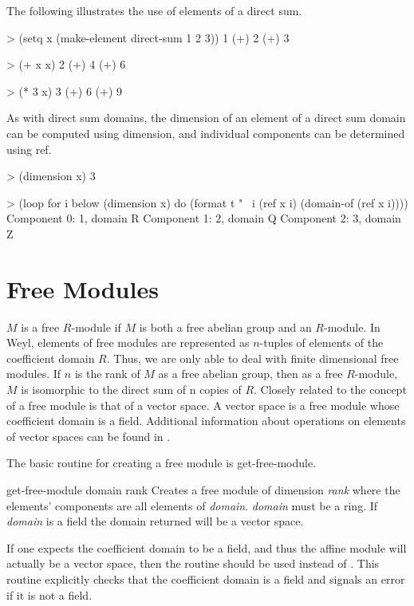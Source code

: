 The following illustrates the use of elements of a direct sum.
\begin{code}  
> (setq x (make-element direct-sum 1 2 3))
1 (+) 2 (+) 3 
  
> (+ x x) 
2 (+) 4 (+) 6
  
> (* 3 x)
3 (+) 6 (+) 9
\end{code}
  
As with direct sum domains, the dimension of an element of a direct
sum domain can be computed using dimension, and individual components
can be determined using {\sf ref}.
\begin{code}
> (dimension x)
3

> (loop for i below (dimension x)
        do (format t "~%
                   i (ref x i) (domain-of (ref x i))))
Component 0: 1, domain R
Component 1: 2, domain Q
Component 2: 3, domain Z
\end{code}

\section{Free Modules}
\label{FreeModules:Sec}
  
$M$ is a free $R$-module if $M$ is both a free abelian group and an
$R$-module. In Weyl, elements of free modules are represented as
$n$-tuples of elements of the coefficient domain $R$. Thus, we are
only able to deal with finite dimensional free modules. If $n$ is the
rank of $M$ as a free abelian group, then as a free $R$-module, $M$ is
isomorphic to the direct sum of n copies of $R$.  Closely related to
the concept of a free module is that of a vector space. A vector space
is a free module whose coefficient domain is a field. Additional
information about operations on elements of vector spaces can be found
in .
  
The basic routine for creating a free module is {\sf get-free-module}.
\begin{functiondef}{get-free-module}{ domain rank}
Creates a free module of dimension {\em rank} where the elements'
components are all elements of {\em domain}.  {\em domain} must be a
ring.  If {\em domain} is a field the domain returned will be a vector
space. 
\end{functiondef}
  
If one expects the coefficient domain to be a field, and thus the
affine module will actually be a vector space, then the routine
 should be used instead of
. This routine explicitly checks that the
coefficient domain is a field and signals an error if it is not a
field.
  
